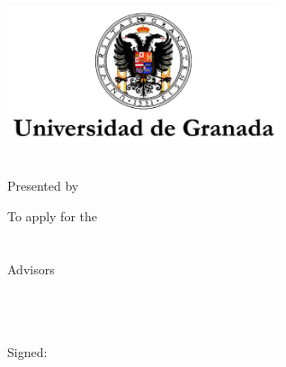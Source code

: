 \begin{titlepage}
    \begin{center}
        \large
        \vspace*{2cm}
        \includegraphics[width=8cm]{gfx/ugr_formal} \\

        \vspace{1.5cm}

        {\color{ugrOrange}\spacedallcaps{\myTitle}} \\ \bigskip
	{\textcolor{ugrGray} {\small Presented by}} \\ \bigskip
        \spacedlowsmallcaps{\myName}

        \vspace{1.5cm}
\textcolor{ugrGray}
        {\small To apply for the }\normalsize\\
        \large{} \\ 
        \large{} \\
\vspace{1.5cm}
\textcolor{ugrGray}{\small Advisors }\normalsize\\
        \large\spacedlowsmallcaps{\myDirectorOne}\\
        \large\spacedlowsmallcaps{\myDirectorTwo}\\
        \large\spacedlowsmallcaps{\myDirectorThree}\\
        \vspace{3cm}

        {\small Signed: \myName }\\ \bigskip
	\myTime


    \end{center}
\end{titlepage}   
